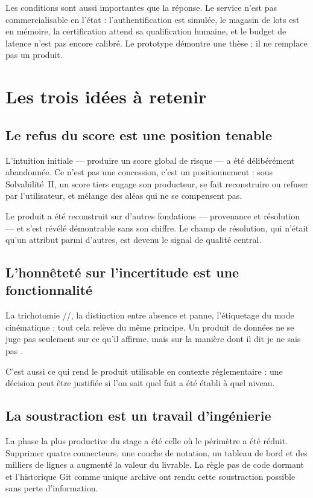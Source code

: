 Les conditions sont aussi importantes que la réponse. Le service n'est pas
commercialisable en l'état : l'authentification est simulée, le magasin de lots
est en mémoire, la certification attend sa qualification humaine, et le budget
de latence n'est pas encore calibré. Le prototype démontre une thèse ; il ne
remplace pas un produit.

\section{Les trois idées à retenir}

\subsection{Le refus du score est une position tenable}

L'intuition initiale — produire un score global de risque — a été délibérément
abandonnée. Ce n'est pas une concession, c'est un positionnement : sous
Solvabilité~II, un score tiers engage son producteur, se fait reconstruire ou
refuser par l'utilisateur, et mélange des aléas qui ne se compensent pas.

Le produit a été reconstruit sur d'autres fondations — provenance et résolution
— et s'est révélé démontrable sans son chiffre. Le champ de résolution, qui
n'était qu'un attribut parmi d'autres, est devenu le signal de qualité central.

\subsection{L'honnêteté sur l'incertitude est une fonctionnalité}

La trichotomie //, la distinction entre
absence et panne, l'étiquetage du mode cinématique : tout cela relève du même
principe. Un produit de données ne se juge pas seulement sur ce qu'il affirme,
mais sur la manière dont il dit \og je ne sais pas \fg.

C'est aussi ce qui rend le produit utilisable en contexte réglementaire : une
décision peut être justifiée si l'on sait quel fait a été établi à quel niveau.

\subsection{La soustraction est un travail d'ingénierie}

La phase la plus productive du stage a été celle où le périmètre a été réduit.
Supprimer quatre connecteurs, une couche de notation, un tableau de bord et des
milliers de lignes a augmenté la valeur du livrable. La règle \og pas de code
dormant \fg{} et l'historique Git comme unique archive ont rendu cette
soustraction possible sans perte d'information.

